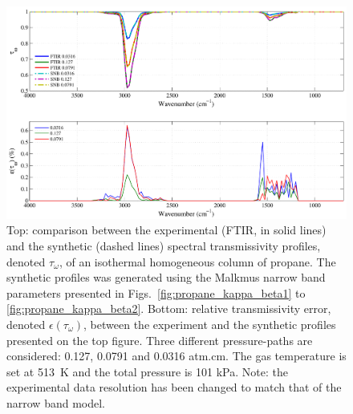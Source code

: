 \begin{figure}[p]
\includegraphics[width=\textwidth]{Figures/Comparison_Fit_Propane_MALKMUS_Temp513K.pdf}
\caption{Top: comparison between the experimental (FTIR, in solid lines) and the synthetic (dashed lines) spectral transmissivity profiles, denoted $\tau_{\omega}$, of an isothermal homogeneous column of propane. The synthetic profiles was generated using the Malkmus narrow band parameters presented in Figs.~\ref{fig:propane_kappa_beta1} to \ref{fig:propane_kappa_beta2}. Bottom: relative transmissivity error, denoted $\epsilon{(\tau_{\omega})}$, between the experiment and the synthetic profiles presented on the top figure. Three different pressure-paths are considered: 0.127, 0.0791 and 0.0316 atm.cm. The gas temperature is set at 513~K and the total pressure is 101 kPa. Note: the experimental data resolution has been changed to match that of the narrow band model. \label{fig:propane_SNBVerify_513K}}
\end{figure}

